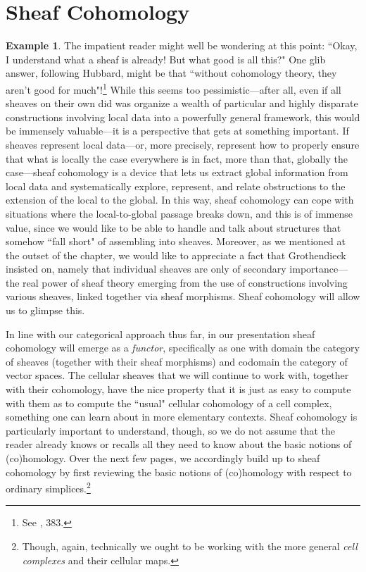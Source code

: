 \documentclass[a4paper]{book}
\theoremstyle{definition}
\newtheorem{example}{Example}[section]
\theoremstyle{definition}
\theoremstyle{definition}
\theoremstyle{theorem}
\theoremstyle{definition}
\begin{document}
	\section{Sheaf Cohomology}
		\begin{example} 
		The impatient reader might well be wondering at this point: ``Okay, I understand what a sheaf is already! But what good is all this?" One glib answer, following Hubbard, might be that ``without cohomology theory, they aren't good for much"!\footnote{See \cite{hubbard_teichmuller_2006}, 383.} While this seems too pessimistic---after all, even if all sheaves on their own did was organize a wealth of particular and highly disparate constructions involving local data into a powerfully general framework, this would be immensely valuable---it is a perspective that gets at something important. If sheaves represent local data---or, more precisely, represent how to properly ensure that what is locally the case everywhere is in fact, more than that, globally the case---sheaf cohomology is a device that lets us extract global information from local data and systematically explore, represent, and relate obstructions to the extension of the local to the global. In this way, sheaf cohomology can cope with situations where the local-to-global passage breaks down, and this is of immense value, since we would like to be able to handle and talk about structures that somehow ``fall short" of assembling into sheaves. Moreover, as we mentioned at the outset of the chapter, we would like to appreciate a fact that Grothendieck insisted on, namely that individual sheaves are only of secondary importance---the real power of sheaf theory emerging from the use of constructions involving various sheaves, linked together via sheaf morphisms. Sheaf cohomology will allow us to glimpse this. \par 
		In line with our categorical approach thus far, in our presentation sheaf cohomology will emerge as a \textit{functor}, specifically as one with domain the category of sheaves (together with their sheaf morphisms) and codomain the category of vector spaces. The cellular sheaves that we will continue to work with, together with their cohomology, have the nice property that it is just as easy to compute with them as to compute the ``usual" cellular cohomology of a cell complex, something one can learn about in more elementary contexts. Sheaf cohomology is particularly important to understand, though, so we do not assume that the reader already knows or recalls all they need to know about the basic notions of (co)homology. Over the next few pages, we accordingly build up to sheaf cohomology by first reviewing the basic notions of (co)homology with respect to ordinary simplices.\footnote{Though, again, technically we ought to be working with the more general \textit{cell complexes} and their cellular maps.}

\end{example}
\end{document}
